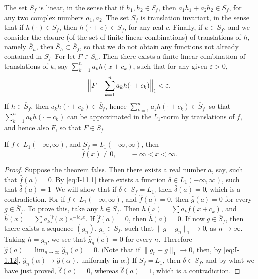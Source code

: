 The set $\overline S_f$ is linear, in the sense that if $h_1,h_2\in\overline S_f$, then $a_1h_1+a_2h_2\in\overline S_f$, for any two complex numbers $a_1,a_2$. The set $\overline S_f$ is translation invariant, in the sense that if $h(\cdot)\in\overline S_f$, then $h(\cdot+c)\in\overline S_f$, for any real $c$. Finally, if $h\in\overline S_f$, and we consider the closure (of the set of finite linear combinations) of translations of $h$, namely $\overline S_h$, then $\overline S_h\subset\overline S_f$, so that we do not obtain any functions not already contained in $\overline S_f$. For let $F\in\overline S_h$. Then there exists a finite linear combination of translations of $h$, say $\sum_{k=1}^{n}a_kh(x+c_k)$, such that for any given $\varepsilon>0$,
\begin{equation*}
\Bigl\|F-\sum_{k=1}^{n}a_kh(\cdot+c_k)\Bigr\|_1<\varepsilon.
\end{equation*}
If $h\in\overline S_f$, then $a_kh(\cdot+c_k)\in\overline S_f$, hence $\sum_{k=1}^{n}a_kh(\cdot+c_k)\in\overline S_f$, so that $\sum_{k=1}^{n}a_kh(\cdot+c_k)$ can be approximated in the $L_1$-norm by translations of $f$, and hence also $F$, so that $F\in\overline S_f$.

\begin{theorem}\label{thm:I-22}
If $f\in L_1(-\infty,\infty)$, and $\overline S_f=L_1(-\infty,\infty)$, then
\begin{equation*}
\widehat f(x)\neq 0,\qquad-\infty<x<\infty.
\end{equation*}
\end{theorem}

\begin{proof}
Suppose the theorem false. Then there exists a real number $a$, say, such that $\widehat f(a)=0$. By \eqref{eq:I-11.1} there exists a function $\delta\in L_1(-\infty,\infty)$, such that $\widehat\delta(a)=1$. We will show that if $\delta\in\overline S_f=L_1$, then $\widehat\delta(a)=0$, which is a contradiction. For if $f\in L_1(-\infty,\infty)$, and $\widehat f(a)=0$, then $\widehat g(a)=0$ for every $g\in\overline S_f$. To prove this, take any $h\in S_f$. Then $h(x)=\sum a_kf(x+c_k)$, and $\widehat h(x)=\sum a_k\widehat f(x)e^{-ic_kx}$. If $\widehat f(a)=0$, then $\widehat h(a)=0$. If now $g\in\overline S_f$, then there exists a sequence $(g_n)$, $g_n\in S_f$, such that $\|g-g_n\|_1\to 0$, as $n\to\infty$. Taking $h=g_n$, we see that $\widehat g_n(a)=0$ for every $n$. Therefore $\widehat g(a)=\lim_{n\to\infty}\widehat g_n(a)=0$. (Note that if $\|g_n-g\|_1\to 0$, then, by \eqref{eq:I-1.12}, $\widehat g_n(\alpha)\to\widehat g(\alpha)$, uniformly in $\alpha$.) If $\overline S_f=L_1$, then $\delta\in\overline S_f$, and by what we have just proved, $\widehat\delta(a)=0$, whereas $\widehat\delta(a)=1$, which is a contradiction.
\end{proof}

